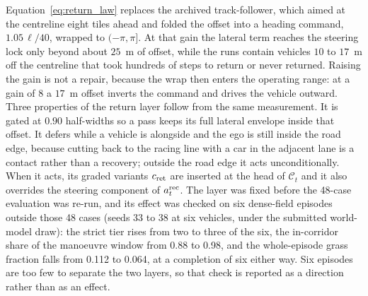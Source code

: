 \documentclass[journal]{IEEEtran}
\begin{document}
Equation~\eqref{eq:return_law} replaces the archived track-follower, which aimed
at the centreline eight tiles ahead and folded the offset into a heading command,
$1.05\,\ell/40$, wrapped to $(-\pi,\pi]$. At that gain the lateral term reaches
the steering lock only beyond about $25$~m of offset, while the runs contain
vehicles $10$ to $17$~m off the centreline that took hundreds of steps to return
or never returned. Raising the gain is not a repair, because the wrap then enters
the operating range: at a gain of $8$ a $17$~m offset inverts the command and
drives the vehicle outward. Three properties of the return layer follow from
the same measurement. It is gated at $0.90$ half-widths so a pass keeps its full
lateral envelope inside that offset. It defers while a vehicle is alongside and
the ego is still inside the road edge, because cutting back to the racing line
with a car in the adjacent lane is a contact rather than a recovery; outside the
road edge it acts unconditionally. When it acts, its graded variants
$c_{\rm ret}$ are inserted at the head of $\mathcal C_t$ and it also overrides
the steering component of $a_t^{\rm rec}$.
The layer was fixed before the 48-case evaluation was re-run, and its effect was
checked on six dense-field episodes outside those 48 cases (seeds 33 to 38 at
six vehicles, under the submitted world-model draw): the strict tier rises from
two to three of the six, the in-corridor share of the manoeuvre window from
0.88 to 0.98, and the whole-episode grass fraction falls from 0.112 to 0.064, at
a completion of six either way. Six episodes are too few to separate the two
layers, so that check is reported as a direction rather than as an effect.
\end{document}
